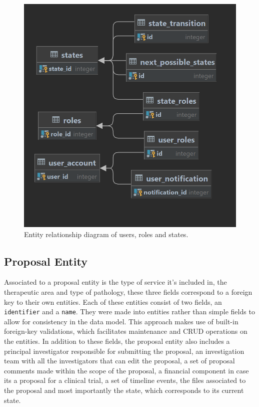\begin{figure}[H]
    \centering
    \includegraphics[scale=0.3]{Chapters/img/model/states-and-user-roles-er-diagram.png}
    \caption{Entity relationship diagram of users, roles and states.}
    \label{fig:er-diagram-users-roles-states}
\end{figure}

\subsection{Proposal Entity}
Associated to a proposal entity is the type of service it's included in, the therapeutic area and type of pathology, these three fields correspond to a foreign key to their own entities. Each of these entities consist of two fields, an \lstinline{identifier} and a \lstinline{name}. They were made into entities rather than simple fields to allow for consistency in the data model. This approach makes use of built-in foreign-key validations, which facilitates maintenance and CRUD operations on the entities. In addition to these fields, the proposal entity also includes a principal investigator responsible for submitting the proposal, an investigation team with all the investigators that can edit the proposal, a set of proposal comments made within the scope of the proposal, a financial component in case its a proposal for a clinical trial, a set of timeline events, the files associated to the proposal and most importantly the state, which corresponds to its current state. 

